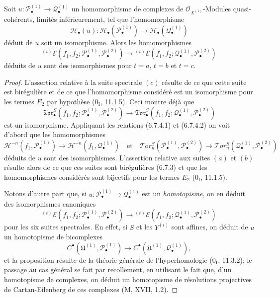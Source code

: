 \begin{proposition}[6.7.5]
Soit $u:\mathscr P_\bullet^{(1)}\to\mathscr Q_\bullet^{(1)}$ un
homomorphisme de complexes de $\mathscr O_{X^{(1)}}$-Modules quasi-cohérents,
limités inférieurement, tel que l'homomorphisme
\[
  \mathscr H_\bullet(u):
  \mathscr H_\bullet(\mathscr P_\bullet^{(1)})
  \longrightarrow
  \mathscr H_\bullet(\mathscr Q_\bullet^{(1)})
\]
déduit de $u$ soit un isomorphisme. Alors les homomorphismes
\[
  {}^{(t)}\mathscr E
  (f_1,f_2;\mathscr P_\bullet^{(1)},\mathscr P_\bullet^{(2)})
  \longrightarrow
  {}^{(t)}\mathscr E
  (f_1,f_2;\mathscr Q_\bullet^{(1)},\mathscr P_\bullet^{(2)})
\]
déduits de $u$ sont des isomorphismes pour $t=a$, $t=b$ et $t=c$.
\end{proposition}

\begin{proof}
L'assertion relative à la suite spectrale $(c)$ résulte de ce que cette suite
est birégulière et de ce que l'homomorphisme considéré est un isomorphisme pour
les termes $E_2$ par hypothèse ($0_{\mathrm I}$, 11.1.5). Ceci montre déjà que
\[
  \mathfrak{Tor}_\bullet^S
  (f_1,f_2;\mathscr P_\bullet^{(1)},\mathscr P_\bullet^{(2)})
  \longrightarrow
  \mathfrak{Tor}_\bullet^S
  (f_1,f_2;\mathscr Q_\bullet^{(1)},\mathscr P_\bullet^{(2)})
\]
est un isomorphisme. Appliquant les relations (6.7.4.1) et (6.7.4.2) on voit
d'abord que les homomorphismes
\[
  \mathscr H^{-n}(f_1,\mathscr P_\bullet^{(1)})
  \longrightarrow
  \mathscr H^{-n}(f_1,\mathscr Q_\bullet^{(1)})
  \quad\text{et}\quad
  \mathscr{T}\!or_n^S
  (\mathscr P_\bullet^{(1)},\mathscr P_\bullet^{(2)})
  \longrightarrow
  \mathscr{T}\!or_n^S
  (\mathscr Q_\bullet^{(1)},\mathscr P_\bullet^{(2)})
\]
déduits de $u$ sont des isomorphismes. L'assertion relative aux suites $(a)$
et $(b)$ résulte alors de ce que ces suites sont birégulières (6.7.3) et que
les homomorphismes considérés sont bijectifs pour les termes $E_2$
($0_{\mathrm I}$, 11.1.5).

Notons d'autre part que, si
$u:\mathscr P_\bullet^{(1)}\to\mathscr Q_\bullet^{(1)}$ est un
\emph{homotopisme}, on en déduit des isomorphismes canoniques
\[
  {}^{(t)}\mathscr E
  (f_1,f_2;\mathscr P_\bullet^{(1)},\mathscr P_\bullet^{(2)})
  \longrightarrow
  {}^{(t)}\mathscr E
  (f_1,f_2;\mathscr Q_\bullet^{(1)},\mathscr P_\bullet^{(2)})
\]
pour les six suites spectrales. En effet, si $S$ et les $Y^{(i)}$ sont affines,
on déduit de $u$ un homotopisme de bicomplexes
\[
  C^\bullet(\mathfrak U^{(1)},\mathscr P_\bullet^{(1)})
  \longrightarrow
  C^\bullet(\mathfrak U^{(1)},\mathscr Q_\bullet^{(1)}),
\]
et la proposition résulte de la théorie générale de l'hyperhomologie
($0_{\mathrm I}$, 11.3.2); le passage au cas général se fait par recollement,
en utilisant le fait que, d'un homotopisme de complexes, on déduit un
homotopisme de résolutions projectives de Cartan-Eilenberg de ces complexes
(M, XVII, 1.2).
\end{proof}

